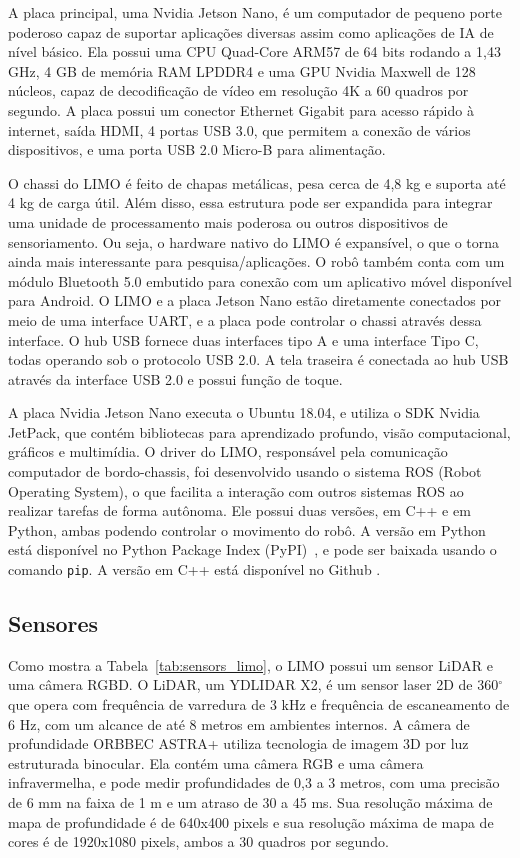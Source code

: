         A placa principal, uma Nvidia Jetson Nano, é um computador de pequeno porte poderoso capaz de suportar aplicações diversas assim como aplicações de IA de nível básico. Ela possui uma CPU Quad-Core ARM57 de 64 bits rodando a 1,43 GHz, 4 GB de memória RAM LPDDR4 e uma GPU Nvidia Maxwell de 128 núcleos, capaz de decodificação de vídeo em resolução 4K a 60 quadros por segundo. A placa possui um conector Ethernet Gigabit para acesso rápido à internet, saída HDMI, 4 portas USB 3.0, que permitem a conexão de vários dispositivos, e uma porta USB 2.0 Micro-B para alimentação.

        O chassi do LIMO é feito de chapas metálicas, pesa cerca de 4,8 kg e suporta até 4 kg de carga útil. Além disso, essa estrutura pode ser expandida para integrar uma unidade de processamento mais poderosa ou outros dispositivos de sensoriamento. Ou seja, o hardware nativo do LIMO é expansível, o que o torna ainda mais interessante para pesquisa/aplicações. O robô também conta com um módulo Bluetooth 5.0 embutido para conexão com um aplicativo móvel disponível para Android. O LIMO e a placa Jetson Nano estão diretamente conectados por meio de uma interface UART, e a placa pode controlar o chassi através dessa interface. O hub USB fornece duas interfaces tipo A e uma interface Tipo C, todas operando sob o protocolo USB 2.0. A tela traseira é conectada ao hub USB através da interface USB 2.0 e possui função de toque.

        A placa Nvidia Jetson Nano executa o Ubuntu 18.04, e utiliza o SDK Nvidia JetPack, que contém bibliotecas para aprendizado profundo, visão computacional, gráficos e multimídia. O driver do LIMO, responsável pela comunicação computador de bordo-chassis, foi desenvolvido usando o sistema ROS (Robot Operating System), o que facilita a interação com outros sistemas ROS ao realizar tarefas de forma autônoma. Ele possui duas versões, em C++ e em Python, ambas podendo controlar o movimento do robô. A versão em Python está disponível no Python Package Index (PyPI)~\cite{limoRosPy}, e pode ser baixada usando o comando \texttt{pip}. A versão em C++ está disponível no Github \cite{limoRos1}.


    \subsection{Sensores}
    \label{sec:Sensores_LIMO}
        Como mostra a Tabela~\ref{tab:sensors_limo}, o LIMO possui um sensor LiDAR e uma câmera RGBD. O LiDAR, um YDLIDAR X2, é um sensor laser 2D de 360$^\circ$ que opera com frequência de varredura de 3 kHz e frequência de escaneamento de 6 Hz, com um alcance de até 8 metros em ambientes internos. 
        A câmera de profundidade ORBBEC ASTRA+ utiliza tecnologia de imagem 3D por luz estruturada binocular. Ela contém uma câmera RGB e uma câmera infravermelha, e pode medir profundidades de 0,3 a 3 metros, com uma precisão de 6 mm na faixa de 1 m e um atraso de 30 a 45 ms. Sua resolução máxima de mapa de profundidade é de 640x400 pixels e sua resolução máxima de mapa de cores é de 1920x1080 pixels, ambos a 30 quadros por segundo.
    
